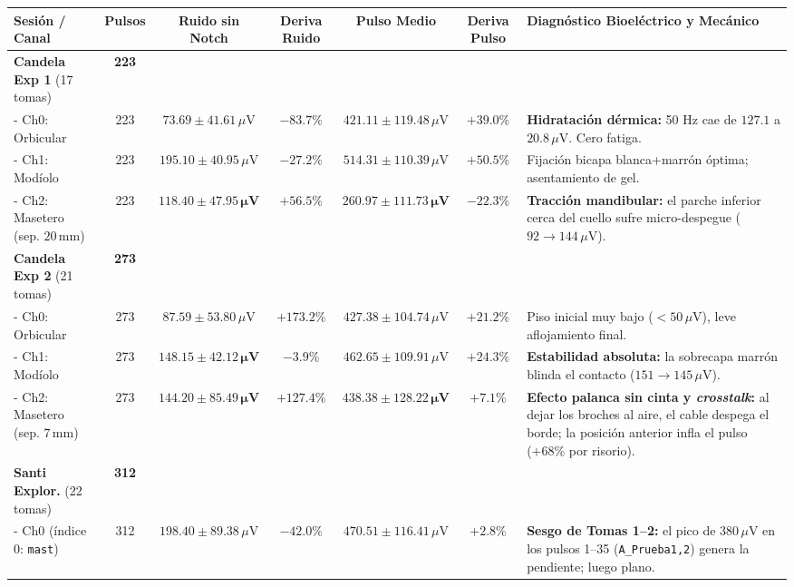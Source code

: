\documentclass[11pt,a4paper]{article}
\begin{document}
\begin{table}[H]
\centering
\scriptsize
\begin{tabularx}{\textwidth}{p{3.1cm} c c c c c X}
\toprule
\textbf{Sesión / Canal} & \textbf{Pulsos} & \textbf{Ruido sin Notch} & \textbf{Deriva Ruido} & \textbf{Pulso Medio} & \textbf{Deriva Pulso} & \textbf{Diagnóstico Bioeléctrico y Mecánico} \\
\midrule
\textbf{Candela Exp 1} (17 tomas) & \textbf{223} & & & & & \\
- Ch0: Orbicular & 223 & $73.69 \pm 41.61\,\mu\text{V}$ & $-83.7\%$ & $421.11 \pm 119.48\,\mu\text{V}$ & $+39.0\%$ & \textbf{Hidratación dérmica:} 50 Hz cae de $127.1$ a $20.8\,\mu\text{V}$. Cero fatiga. \\
- Ch1: Modíolo   & 223 & $195.10 \pm 40.95\,\mu\text{V}$ & $-27.2\%$ & $514.31 \pm 110.39\,\mu\text{V}$ & $+50.5\%$ & Fijación bicapa blanca+marrón óptima; asentamiento de gel. \\
- Ch2: Masetero (sep. $20\,\text{mm}$) & 223 & $\mathbf{118.40 \pm 47.95\,\mu\text{V}}$ & $\mathbf{+56.5\%}$ & $\mathbf{260.97 \pm 111.73\,\mu\text{V}}$ & $\mathbf{-22.3\%}$ & \textbf{Tracción mandibular:} el parche inferior cerca del cuello sufre micro-despegue ($92 \to 144\,\mu\text{V}$). \\
\midrule
\textbf{Candela Exp 2} (21 tomas) & \textbf{273} & & & & & \\
- Ch0: Orbicular & 273 & $87.59 \pm 53.80\,\mu\text{V}$  & $+173.2\%$ & $427.38 \pm 104.74\,\mu\text{V}$ & $+21.2\%$ & Piso inicial muy bajo ($<50\,\mu\text{V}$), leve aflojamiento final. \\
- Ch1: Modíolo   & 273 & $\mathbf{148.15 \pm 42.12\,\mu\text{V}}$ & $\mathbf{-3.9\%}$ & $462.65 \pm 109.91\,\mu\text{V}$ & $+24.3\%$ & \textbf{Estabilidad absoluta:} la sobrecapa marrón blinda el contacto ($151 \to 145\,\mu\text{V}$). \\
- Ch2: Masetero (sep. $7\,\text{mm}$) & 273 & $\mathbf{144.20 \pm 85.49\,\mu\text{V}}$ & $\mathbf{+127.4\%}$ & $\mathbf{438.38 \pm 128.22\,\mu\text{V}}$ & $\mathbf{+7.1\%}$ & \textbf{Efecto palanca sin cinta y \textit{crosstalk}:} al dejar los broches al aire, el cable despega el borde; la posición anterior infla el pulso (+68\% por risorio). \\
\midrule
\textbf{Santi Explor.} (22 tomas) & \textbf{312} & & & & & \\
- Ch0 (índice 0: \texttt{mast}) & 312 & $198.40 \pm 89.38\,\mu\text{V}$ & $-42.0\%$  & $470.51 \pm 116.41\,\mu\text{V}$ & $+2.8\%$  & \textbf{Sesgo de Tomas 1--2:} el pico de $380\,\mu\text{V}$ en los pulsos 1--35 (\texttt{A\_Prueba1,2}) genera la pendiente; luego plano. \\

\end{tabularx}
\end{table}
\end{document}
